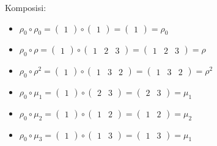 \documentclass{article}
\begin{document}
    Komposisi:
    \begin{itemize}
        \item $\rho_0\circ\rho_0 =\begin{pmatrix}1\end{pmatrix}\circ\begin{pmatrix}1\end{pmatrix}=\begin{pmatrix}1\end{pmatrix}=\rho_0$
        \item $\rho_0\circ\rho =\begin{pmatrix}1\end{pmatrix}\circ\begin{pmatrix}1&2&3\end{pmatrix}=\begin{pmatrix}1&2&3\end{pmatrix}=\rho$
        \item $\rho_0\circ\rho^2 =\begin{pmatrix}1\end{pmatrix}\circ\begin{pmatrix}1&3&2\end{pmatrix}=\begin{pmatrix}1&3&2\end{pmatrix}=\rho^2$
        \item $\rho_0\circ\mu_1 =\begin{pmatrix}1\end{pmatrix}\circ\begin{pmatrix}2&3\end{pmatrix}=\begin{pmatrix}2&3\end{pmatrix}=\mu_1$
        \item $\rho_0\circ\mu_2 =\begin{pmatrix}1\end{pmatrix}\circ\begin{pmatrix}1&2\end{pmatrix}=\begin{pmatrix}1&2\end{pmatrix}=\mu_2$
        \item $\rho_0\circ\mu_3 =\begin{pmatrix}1\end{pmatrix}\circ\begin{pmatrix}1&3\end{pmatrix}=\begin{pmatrix}1&3\end{pmatrix}=\mu_1$
        

\end{itemize}
\end{document}
